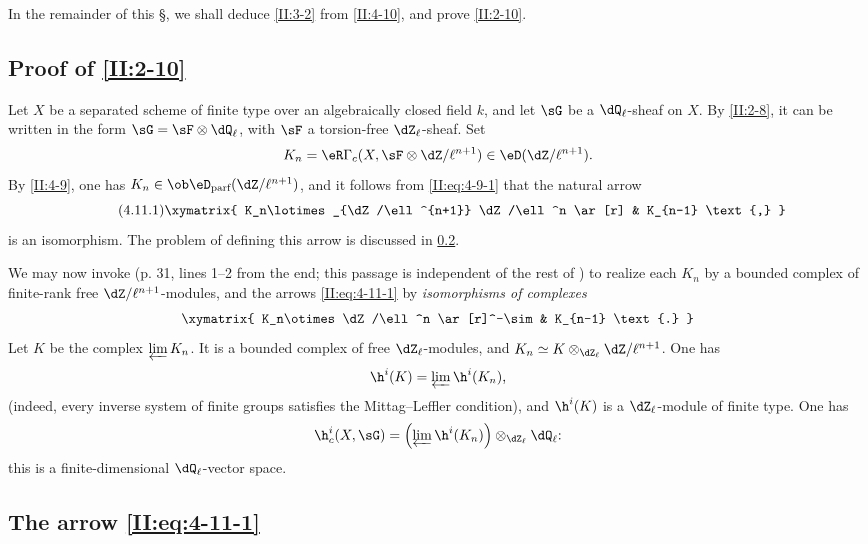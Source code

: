 In the remainder of this \S, we shall deduce \ref{II:3-2} from
\ref{II:4-10}, and prove \ref{II:2-10}.






\subsection{Proof of \texorpdfstring{\ref{II:2-10}}{2.10}}\label{II:4-11}

Let $X$ be a separated scheme of finite type over an algebraically closed
field $k$, and let $\sG$ be a $\dQ_\ell$-sheaf on $X$. By \ref{II:2-8}, it
can be written in the form $\sG=\sF\otimes\dQ_\ell$, with $\sF$ a
torsion-free $\dZ_\ell$-sheaf. Set
\[
  K_n = \eR \Gamma_c(X,\sF\otimes\dZ/\ell^{n+1})\in\eD(\dZ/\ell^{n+1}) \text{.}
\]
By \ref{II:4-9}, one has
$K_n\in\ob\eD_\text{parf}(\dZ/\ell^{n+1})$, and it follows from
\eqref{II:eq:4-9-1} that the natural arrow
\begin{equation*}\tag{4.11.1}\label{II:eq:4-11-1}
\xymatrix{
  K_n\lotimes_{\dZ/\ell^{n+1}} \dZ/\ell^n \ar[r] & K_{n-1} \text{,}
}
\end{equation*}
is an isomorphism. The problem of defining this arrow is discussed in
\ref{II:4-12}.

We may now invoke \cite[XV.3.3]{sga5} (p. 31, lines 1--2 from the end; this
passage is independent of the rest of \cite{sga5}) to realize each $K_n$ by
a bounded complex of finite-rank free $\dZ/\ell^{n+1}$-modules, and the
arrows \eqref{II:eq:4-11-1} by \emph{isomorphisms of complexes}
\[\xymatrix{
  K_n\otimes \dZ/\ell^n \ar[r]^-\sim
    & K_{n-1} \text{.}
}\]
Let $K$ be the complex $\varprojlim K_n$. It is a bounded complex of free
$\dZ_\ell$-modules, and
$K_n\simeq K\otimes_{\dZ_\ell}\dZ/\ell^{n+1}$. One has
\[
  \h^i(K) = \varprojlim \h^i(K_n) \text{,}
\]
(indeed, every inverse system of finite groups satisfies the Mittag--Leffler
condition), and $\h^i(K)$ is a $\dZ_\ell$-module of finite type. One has
\[
  \h_c^i(X,\sG) = \left(\varprojlim \h^i(K_n) \right)\otimes_{\dZ_\ell} \dQ_\ell \text{:}
\]
this is a finite-dimensional $\dQ_\ell$-vector space.






\subsection{The arrow \texorpdfstring{\eqref{II:eq:4-11-1}}{(4.11.1)}}\label{II:4-12}

